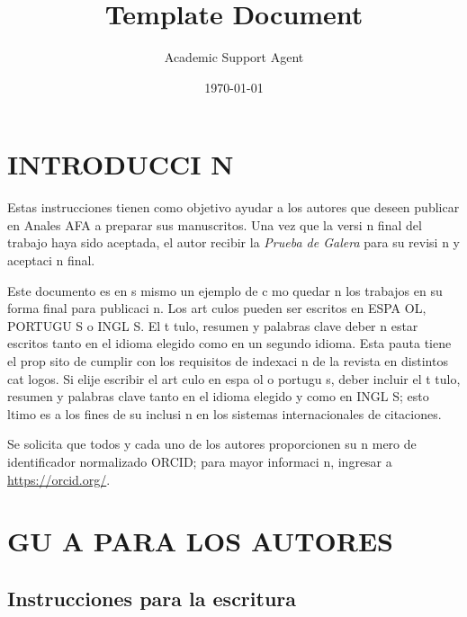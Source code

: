 \documentclass{article}
\title{Template Document}
\author{Academic Support Agent}
\date{\today}
\begin{document}
\maketitle


\thispagestyle{empty}     

\section{INTRODUCCI N}

Estas instrucciones tienen como objetivo ayudar a los autores que deseen publicar en Anales AFA a preparar sus manuscritos. Una vez que la versi n final del trabajo haya sido aceptada, el autor recibir  la \textit{Prueba de Galera} para su revisi n y aceptaci n final.

Este documento es en s  mismo un ejemplo de c mo quedar n los trabajos en su forma final para publicaci n. Los art culos pueden ser escritos en ESPA OL, PORTUGU S o INGL S. El t tulo, resumen y palabras clave deber n estar escritos tanto en el idioma elegido como en un segundo idioma. Esta pauta tiene el prop sito de cumplir con los requisitos de indexaci n de la revista en distintos cat logos.
Si elije escribir el art culo en espa ol o portugu s, deber  incluir el t tulo, resumen y palabras clave tanto en el idioma elegido y como en INGL S; esto  ltimo es a los fines de su inclusi n en los sistemas internacionales de citaciones. 

Se solicita que todos y cada uno de los autores proporcionen su n mero de identificador normalizado ORCID; para mayor informaci n, ingresar a \url{https://orcid.org/}.


\section{GU A PARA LOS AUTORES}
\subsection{Instrucciones para la escritura}
\end{document}
